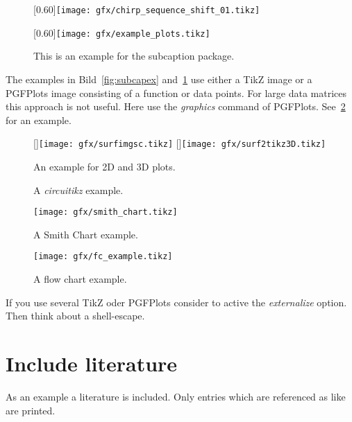 \begin{figure}[tbp]
  \centering
  [0.60\linewidth]{\texttt{[image: gfx/chirp\_sequence\_shift\_01.tikz]}}
  \par\bigskip
  [0.60\linewidth]{\texttt{[image: gfx/example\_plots.tikz]}}
  \caption{This is an example for the subcaption package.}
  \label{fig:subcapex2}
\end{figure}

The examples in Bild~\ref{fig:subcapex} and~\ref{fig:subcapex2} use either a TikZ image or a
PGFPlots image consisting of a function or data points. For large data matrices this approach is not
useful. Here use the \emph{graphics} command of PGFPlots. See~\ref{fig:pgfplots} for an example.

\begin{figure}[tbp]
  \begin{minipage}[b][\textheight][b]{\linewidth}
    \centering
    [\linewidth]{\texttt{[image: gfx/surfimgsc.tikz]}}
    \vfill
    [\linewidth]{\texttt{[image: gfx/surf2tikz3D.tikz]}}
    \caption{An example for 2D and 3D plots.}
    \label{fig:pgfplots}
  \end{minipage}
\end{figure}

\begin{figure}[tbp]
  \centering
  
  \caption{A \emph{circuitikz} example.}
  \label{fig:cwradar}
\end{figure}

\begin{figure}[tbp]
  \centering
  \texttt{[image: gfx/smith\_chart.tikz]}
  \caption{A Smith Chart example.}
  \label{fig:sc}
\end{figure}

\begin{figure}[tbp]
  \centering
  \texttt{[image: gfx/fc\_example.tikz]}
  \caption{A flow chart example.}
  \label{fig:fc}
\end{figure}

If you use several TikZ oder PGFPlots consider to active the \emph{externalize} option. Then think about a
shell-escape.

\chapter{Include literature}
As an example a literature is included. Only entries which are referenced as like~\cite{Roos2015}
are printed.
